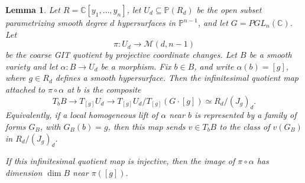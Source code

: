 \documentclass[11pt]{amsart}
\theoremstyle{plain}
\newtheorem{lem}[subsection]{Lemma}
\theoremstyle{definition}
\numberwithin{equation}{section}
\newcommand{\M}{{\mathcal M}}
\newcommand{\C}{\mathbb{C}}
\newcommand{\PP}{\mathbb{P}}
\begin{document}
\begin{lem}
\label{lem:psi-luna-slice}
Let $R=\C[y_1,\ldots,y_n]$, let $U_d\subseteq\PP(R_d)$ be the open subset
parametrizing smooth degree $d$ hypersurfaces in $\PP^{n-1}$, and let
$G=PGL_n(\C)$. Let
\[
\pi:U_d\longrightarrow \M(d,n-1)
\]
be the coarse GIT quotient by projective coordinate changes. Let $B$ be a smooth
variety and let $\alpha:B\to U_d$ be a morphism. Fix $b\in B$, and write
$\alpha(b)=[g]$, where $g\in R_d$ defines a smooth hypersurface. Then the
infinitesimal quotient map attached to $\pi\circ\alpha$ at $b$ is the composite
\[
T_bB\longrightarrow T_{[g]}U_d
\longrightarrow
T_{[g]}U_d/T_{[g]}(G\cdot[g])
\simeq R_d/(J_g)_d .
\]
Equivalently, if a local homogeneous lift of $\alpha$ near $b$ is represented
by a family of forms $G_B$, with $G_B(b)=g$, then this map sends
$v\in T_bB$ to the class of $v(G_B)$ in $R_d/(J_g)_d$.

If this infinitesimal quotient map is injective, then the image of
$\pi\circ\alpha$ has dimension $\dim B$ near $\pi([g])$.
\end{lem}
\end{document}
